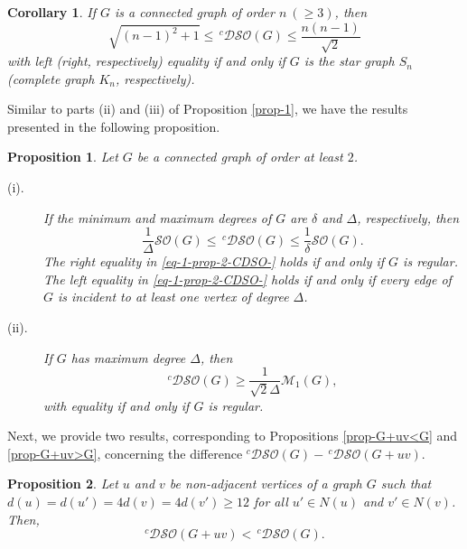 \documentclass[12pt,a4paper]{article}
\newtheorem{proposition}{Proposition}[section]
\newtheorem{corollary}{Corollary}[section]
\begin{document}
\begin{corollary}\label{cor-cnctd-graphs}
If $G$ is a connected graph of order $n\ (\ge 3)$, then
\begin{equation}\label{eq-CDSO-cnctd}
\sqrt{(n-1)^2+1}\le\, ^c\mathcal{DSO}(G)   \le \frac{n(n-1)}{\sqrt{2}}
\end{equation}
with left (right, respectively) equality if and only if $G$ is the star graph $S_n$ (complete graph $K_n$, respectively).
\end{corollary}


Similar to parts (ii) and (iii) of Proposition \ref{prop-1}, we have the results presented in the following proposition.

\begin{proposition}\label{prop-1-CDSO}
Let $G$ be a connected graph of order at least $2$.
\begin{description}
    \item[(i).] If the minimum and maximum degrees of $G$ are  $\delta$ and  $\Delta$, respectively, then
\begin{equation}\label{eq-1-prop-2-CDSO-}
\frac{1}{\Delta}\mathcal{SO}(G)\le  \,^c\mathcal{DSO}(G) \le \frac{1}{\delta}\mathcal{SO}(G).
\end{equation}
The right equality in \eqref{eq-1-prop-2-CDSO-} holds if and only if $G$ is regular. The left equality in \eqref{eq-1-prop-2-CDSO-} holds if and only if every edge of $G$ is incident to at least one vertex of degree $\Delta$.
\item[(ii).] If $G$ has maximum degree $\Delta$, then
\begin{equation*}
^c\mathcal{DSO}(G) \ge \frac{1}{\sqrt{2}\Delta}\mathcal{M}_1(G),
\end{equation*}
with equality if and only if $G$ is regular.

\end{description}

\end{proposition}






Next, we provide two results, corresponding to Propositions \ref{prop-G+uv<G} and \ref{prop-G+uv>G}, concerning the difference $
 ^c\mathcal{DSO}(G) -\, ^c\mathcal{DSO}(G+uv)$.

\begin{proposition}\label{prop-G+uv<G-CDSO}
Let $u$ and $v$ be non-adjacent vertices of a graph $G$ such that $d(u)= d(u')=4d(v)=4d(v')\ge12$ for all $u'\in N(u)$ and $v'\in N(v)$. Then,
$$
^c\mathcal{DSO}(G+uv)
<\, ^c\mathcal{DSO}(G).
$$
\end{proposition}
\end{document}
